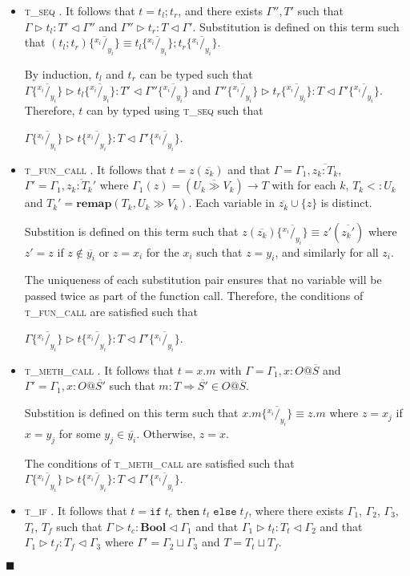 \documentclass[preprint]{sigplanconf}
\makeatletter
\newcommand{\tif}{\textsc{t\_if} }
\newcommand{\tseq}{\textsc{t\_seq} }
\newcommand{\tfunc}{\textsc{t\_fun\_call} }
\newcommand{\tmethc}{\textsc{t\_meth\_call} }
\newcommand{\remapapp}[3]{\ensuremath{\mathbf{remap}(#1, #2 \gg #3)}}
\newcommand{\typerule}[4]{#1 \triangleright #2 : #3 \triangleleft #4}
\newcommand{\subst}[3]{#3 \{\overline{^{#1}/_{#2}}\}}
\newcommand{\substxy}[1]{\subst{x_i}{y_i}{#1}}
\newcommand{\boolt}{\mathbf{Bool}}
\newcommand{\ot}[2]{#1@\overline{#2}}
\newcommand{\funt}[3]{(\overline{#1 \gg #2}) \rightarrow #3}
\newcommand{\ift}[3]{\mathtt{if} \; #1 \; \mathtt{then} \; #2 \; \mathtt{else} \; #3}
\newcommand{\qed}{$\blacksquare$}
\newenvironment{proof}{\vspace{1ex}\noindent{\bf Proof}\hspace{0.5em}}
  {\hfill\qed\vspace{1ex}}
\makeatother
\begin{document}
\begin{proof}
\begin{itemize}
\item \tseq. It follows that $t = t_l ; t_r$,
and there exists $\Gamma'', T'$ such that
$\typerule{\Gamma}{t_l}{T'}{\Gamma''}$ and
$\typerule{\Gamma''}{t_r}{T}{\Gamma'}$.
Substitution is defined on this term such that
$\subst{x_i}{y_i}{(t_l ; t_r)} \equiv \subst{x_i}{y_i}{t_l} ; \subst{x_i}{y_i}{t_r}$.

By induction, $t_l$ and $t_r$ can be typed such that
$\typerule{\subst{x_i}{y_i}{\Gamma}}{\subst{x_i}{y_i}{t_l}}{T'}{\subst{x_i}{y_i}{\Gamma''}}$ and
$\typerule{\subst{x_i}{y_i}{\Gamma''}}{\subst{x_i}{y_i}{t_r}}{T}{\subst{x_i}{y_i}{\Gamma'}}$.
Therefore, $t$ can by typed using \tseq such that

$\typerule{\subst{x_i}{y_i}{\Gamma}}{\subst{x_i}{y_i}{t}}{T}{\subst{x_i}{y_i}{\Gamma'}}$.

\item \tfunc. It follows that $t = z ( \overline{z_k} )$ and
that $\Gamma = \Gamma_1, \overline{z_k : T_k}$,
$\Gamma' = \Gamma_1, \overline{z_k : T_k'}$
where $\Gamma_1(z) = \funt{U_k}{V_k}{T}$ with for each $k$,
$T_k <: U_k$ and $T_k' = \remapapp{T_k}{U_k}{V_k}$. Each
variable in $\overline{z_k} \cup \{ z \}$ is distinct.


Substition is defined on this term such that
$\subst{x_i}{y_i}{z ( \overline{z_k} )} \equiv z' ( \overline{z_k'} )$
where $z' = z$ if $z \notin \overline{y_i}$ or $z = x_i$ for the $x_i$ such
that $z = y_i$, and similarly for all $z_i$.

The uniqueness of each substitution pair ensures
that no variable will be passed twice as part of the function call.
Therefore, the conditions of \tfunc are satisfied such that

$\typerule{\substxy{\Gamma}}{\substxy{t}}{T}{\substxy{\Gamma'}}$.

\item \tmethc. It follows that $t = x.m$ with
$\Gamma = \Gamma_1, x : \ot{O}{S}$ and
$\Gamma' = \Gamma_1, x : \ot{O}{S'}$ such
that $m : T \Rightarrow \overline{S'} \in \ot{O}{S}$.

Substition is defined on this term such that
$\subst{x_i}{y_i}{x.m} \equiv z.m$
where $z = x_j$ if $x = y_j$ for some $y_j \in \overline{y_i}$.
Otherwise, $z = x$.

The conditions of \tmethc are satisfied such that
$\typerule{\substxy{\Gamma}}{\substxy{t}}{T}{\substxy{\Gamma'}}$.

\item \tif. It follows that $t = \ift{t_c}{t_t}{t_f}$,
where there exists $\Gamma_1$, $\Gamma_2$, $\Gamma_3$, $T_t$, $T_f$
such that
$\typerule{\Gamma}{t_c}{\boolt}{\Gamma_1}$ and that
$\typerule{\Gamma_1}{t_t}{T_t}{\Gamma_2}$ and that
$\typerule{\Gamma_1}{t_f}{T_f}{\Gamma_3}$ where
$\Gamma' = \Gamma_2 \sqcup \Gamma_3$ and $T = T_t \sqcup T_f$.


\end{itemize}
\end{proof}
\end{document}
